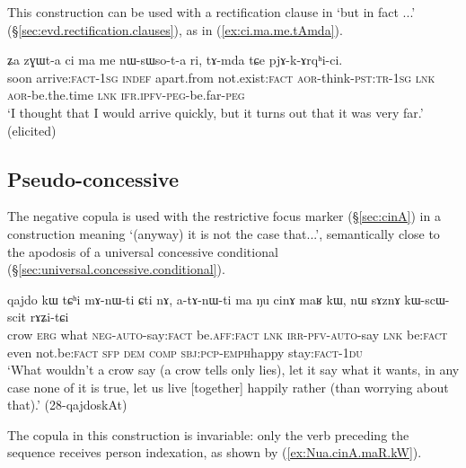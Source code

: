 This construction can be used with a rectification clause in   `but in fact ...' (§\ref{sec:evd.rectification.clauses}), as in (\ref{ex:ci.ma.me.tAmda}).

\begin{exe}
	\ex \label{ex:ci.ma.me.tAmda}
	\gll ʑa zɣɯt-a ci ma me nɯ-sɯso-t-a ri, tɤ-mda tɕe pjɤ-k-ɤrqʰi-ci. \\
	soon arrive:\textsc{fact}-\textsc{1sg} \textsc{indef} apart.from not.exist:\textsc{fact} \textsc{aor}-think-\textsc{pst}:\textsc{tr}-\textsc{1sg} \textsc{lnk} 
	\textsc{aor}-be.the.time \textsc{lnk}  \textsc{ifr}.\textsc{ipfv}-\textsc{peg}-be.far-\textsc{peg} \\
	\glt `I thought that I would arrive quickly, but it turns out that it was very far.' (elicited)
\end{exe}

\subsection{Pseudo-concessive} \label{sec:cinAmaRkW}
The negative copula  is used with the restrictive focus marker  (§\ref{sec:cinA}) in a construction meaning `(anyway) it is not the case that...', semantically close to the apodosis of a universal concessive conditional (§\ref{sec:universal.concessive.conditional}).


\begin{exe}
	\ex \label{ex:Nu.cinA.maR.kW}
	\gll qajdo kɯ tɕʰi mɤ-nɯ-ti ɕti nɤ, a-tɤ-nɯ-ti ma ŋu cinɤ maʁ kɯ, nɯ sɤznɤ kɯ-scɯ-scit rɤʑi-tɕi \\
	crow \textsc{erg} what \textsc{neg}-\textsc{auto}-say:\textsc{fact} be.\textsc{aff}:\textsc{fact} \textsc{lnk} \textsc{irr}-\textsc{pfv}-\textsc{auto}-say \textsc{lnk} be:\textsc{fact} even not.be:\textsc{fact} \textsc{sfp} \textsc{dem} \textsc{comp} \textsc{sbj}:\textsc{pcp}-\textsc{emph}\redp{}happy stay:\textsc{fact}-\textsc{1du} \\
	\glt `What wouldn't a crow say (a crow tells only lies), let it say what it wants, in any case none of it is true, let us live [together] happily rather (than worrying about that).' (28-qajdoskAt)
\end{exe} 

The copula  in this construction is invariable: only the verb preceding the  sequence receives person indexation, as shown by (\ref{ex:Nua.cinA.maR.kW}).  

